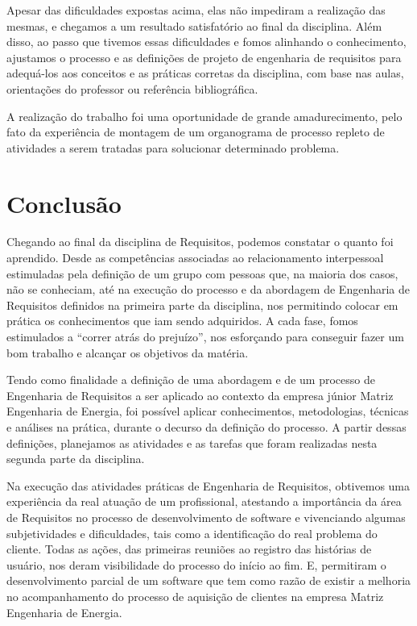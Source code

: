 \indent Apesar das dificuldades expostas acima, elas não impediram a realização das mesmas, e chegamos a um resultado satisfatório 
ao final da disciplina. Além disso, ao passo que tivemos essas dificuldades e fomos alinhando o conhecimento, ajustamos o processo 
e as definições de projeto de engenharia de requisitos para adequá-los aos conceitos e as práticas corretas da disciplina, com base 
nas aulas, orientações do professor ou referência bibliográfica.


\indent A realização do trabalho foi uma oportunidade de grande amadurecimento, pelo fato da experiência de montagem de um organograma 
de processo repleto de atividades a serem tratadas para solucionar determinado problema.

\section{Conclusão}

Chegando ao final da disciplina de Requisitos, podemos constatar o quanto foi aprendido. Desde as competências associadas ao relacionamento interpessoal estimuladas pela definição de um grupo com pessoas que, na maioria dos casos, não se conheciam, até na execução do processo e da abordagem de Engenharia de Requisitos definidos na primeira parte da disciplina, nos permitindo colocar em prática os conhecimentos que iam sendo adquiridos. A cada fase, fomos estimulados a “correr atrás do prejuízo”, nos esforçando para conseguir fazer um bom trabalho e alcançar os objetivos da matéria.

Tendo como finalidade a definição de uma abordagem e de um processo de Engenharia de Requisitos a ser aplicado ao contexto da empresa júnior Matriz Engenharia de Energia, foi possível aplicar conhecimentos, metodologias, técnicas e análises na prática, durante o decurso da definição do processo. A partir dessas definições, planejamos as atividades e as tarefas que foram realizadas nesta segunda parte da disciplina.

Na execução das atividades práticas de Engenharia de Requisitos, obtivemos uma experiência da real atuação de um profissional, atestando a importância da área de Requisitos no processo de desenvolvimento de software e vivenciando algumas subjetividades e dificuldades, tais como a identificação do real problema do cliente. Todas as ações, das primeiras reuniões ao registro das histórias de usuário, nos deram visibilidade do processo do início ao fim. E, permitiram o desenvolvimento parcial de um software que tem como razão de existir a melhoria no acompanhamento do processo de aquisição de clientes na empresa Matriz Engenharia de Energia.

